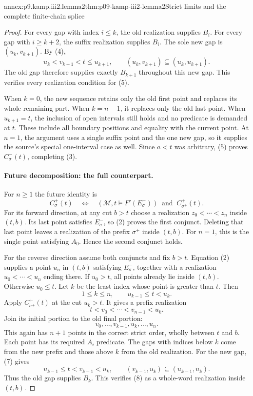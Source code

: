 \begin{annexitem}{annex:p9.kamp.iii2.lemma2}{thm:p09-kamp-iii2-lemma2}{Strict limits and the complete finite-chain splice}
\begin{proof}
For every gap with index \(i\leq k\), the old realization supplies
\(B_i\).  For every gap with \(i\geq k+2\), the suffix realization
supplies \(B_i\).  The sole new gap is
\((u_k,v_{k+1})\).  By (4),
\[
       u_k<v_{k+1}<t\leq u_{k+1},\qquad
       (u_k,v_{k+1})\subseteq(u_k,u_{k+1}).
\]
The old gap therefore supplies exactly \(B_{k+1}\) throughout this new
gap.  This verifies every realization condition for (5).

When \(k=0\), the new sequence retains only the old first point and
replaces its whole remaining part.  When \(k=n-1\), it replaces only
the old last point.  When \(u_{k+1}=t\), the inclusion of open intervals
still holds and no predicate is demanded at \(t\).  These include all
boundary positions and equality with the current point.  At \(n=1\),
the argument uses a single suffix point and the one new gap, so it supplies
the source's special one-interval case as well.  Since \(a<t\) was
arbitrary, (5) proves \(C^-_\sigma(t)\), completing (3).

\paragraph{Future decomposition: the full counterpart.}
For \(n\geq1\) the future identity is
\[
 C^+_\sigma(t)\quad\Longleftrightarrow\quad
  (\mathcal M,t\models F'(E^-_\sigma))\ \text{ and }\
                                    C^+_{\sigma^+}(t).
\tag{6}
\]
For its forward direction, at any cut \(b>t\) choose a realization
\(z_0<\cdots<z_n\) inside \((t,b)\).  Its last point satisfies
\(E^-_\sigma\), so (2) proves the first conjunct.  Deleting that last
point leaves a realization of the prefix \(\sigma^+\) inside \((t,b)\).
For \(n=1\), this is the single point satisfying \(A_0\).  Hence the
second conjunct holds.

For the reverse direction assume both conjuncts and fix \(b>t\).
Equation (2) supplies a point \(u_n\) in \((t,b)\) satisfying
\(E^-_\sigma\), together with a realization
\(u_0<\cdots<u_n\) ending there.  If \(u_0>t\), all points already
lie inside \((t,b)\).  Otherwise \(u_0\leq t\).  Let \(k\) be the
least index whose point is greater than \(t\).  Then
\[
              1\leq k\leq n,\qquad u_{k-1}\leq t<u_k.
\tag{7}
\]
Apply \(C^+_{\sigma^+}(t)\) at the cut \(u_k>t\).  It gives a
prefix realization
\[
                    t<v_0<\cdots<v_{n-1}<u_k.
\]
Join its initial portion to the old final portion:
\[
                   v_0,\ldots,v_{k-1},u_k,\ldots,u_n.
\tag{8}
\]
This again has \(n+1\) points in the correct strict order, wholly between
\(t\) and \(b\).  Each point has its required \(A_i\) predicate.
The gaps with indices below \(k\) come from the new prefix and those
above \(k\) from the old realization.  For the new gap, (7) gives
\[
 u_{k-1}\leq t<v_{k-1}<u_k,\qquad
       (v_{k-1},u_k)\subseteq(u_{k-1},u_k).
\]
Thus the old gap supplies \(B_k\).  This verifies (8) as a whole-word
realization inside \((t,b)\).


\end{proof}
\end{annexitem}
